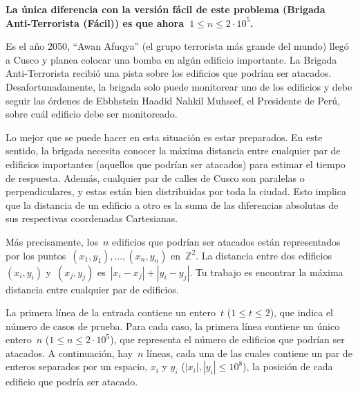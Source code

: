 
\textbf{La única diferencia con la versión fácil de este problema (Brigada
  Anti-Terrorista (Fácil)) es que ahora~$1 \leq n \leq 2 \cdot 10^5$.}

Es el año 2050, ``Awan Afuqya'' (el grupo terrorista más grande del mundo) llegó a
Cusco y planea colocar una bomba en algún edificio importante. La Brigada
Anti-Terrorista recibió una pista sobre los edificios que podrían ser
atacados. Desafortunadamente, la brigada solo puede monitorear uno de los edificios y
debe seguir las órdenes de Ebbhstein Haadid Nahkil Muhssef, el Presidente de Perú,
sobre cuál edificio debe ser monitoreado.

Lo mejor que se puede hacer en esta situación es estar preparados. En este sentido,
la brigada necesita conocer la máxima distancia entre cualquier par de edificios
importantes (aquellos que podrían ser atacados) para estimar el tiempo de
respuesta. Además, cualquier par de calles de Cusco son paralelas o perpendiculares,
y estas están bien distribuidas por toda la ciudad. Esto implica que la distancia de
un edificio a otro es la suma de las diferencias absolutas de sus respectivas
coordenadas Cartesianas.

Más precisamente, los~$n$ edificios que podrían ser atacados están representados por
los puntos~$(x_1, y_1), \dots, (x_n, y_n)$ en~$\mathbb{Z}^2$. La distancia entre dos
edificios~$(x_i, y_i)$ y~$(x_j, y_j)$ es~$|x_i - x_j| + |y_i - y_j|$. Tu trabajo es
encontrar la máxima distancia entre cualquier par de edificios.


La primera línea de la entrada contiene un entero~$t$ ($1 \leq t \leq 2$), que indica
el número de casos de prueba. Para cada caso, la primera línea contiene un único
entero~$n$ ($1 \leq n \leq 2 \cdot 10^5$), que representa el número de edificios que
podrían ser atacados. A continuación, hay~$n$ líneas, cada una de las cuales contiene
un par de enteros separados por un espacio, $x_i$ y $y_i$ ($|x_i|, |y_i| \leq 10^8$),
la posición de cada edificio que podría ser atacado.

\outputText

